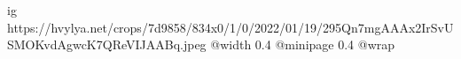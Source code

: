  
 
 
 
 

\ifcmt
  ig https://hvylya.net/crops/7d9858/834x0/1/0/2022/01/19/295Qn7mgAAAx2IrSvUSMOKvdAgwcK7QReVIJAABq.jpeg
  @width 0.4
  @minipage 0.4
  @wrap \parpic[r]
\fi
